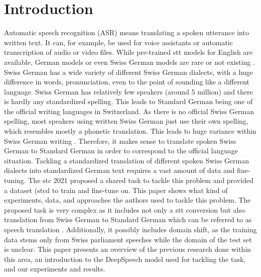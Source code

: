 \section{Introduction}
Automatic speech recognition (ASR) means translating a spoken utterance into written text. It can, for example, be used for voice assistants or automatic transcription of audio or video files. While
pre-trained \gls{stt} models for English are available, German models or even Swiss German models are rare or not existing \cite{Agarwal2019GermanES}. Swiss German has a wide variety of different
Swiss German dialects, with a huge difference in words, pronunciation, even to the point of sounding like a different language. Swiss German has relatively few speakers (around 5 million) and there
is hardly any standardized spelling. This leads to Standard German being one of the official writing languages in Switzerland. As there is no official Swiss German spelling, most speakers using written
Swiss German just use their own spelling, which resembles mostly a phonetic translation. This leads to huge variance within Swiss German writing \citep{pluss2020}. Therefore, it makes sense to
translate spoken Swiss German to Standard German in order to correspond to the official language situation. Tackling a standardized translation of different spoken Swiss German dialects into
standardized German text requires a vast amount of data and fine-tuning. The \gls{stc} 2021 proposed a shared task to tackle this problem and provided a dataset
(\gls{stcd} to train and fine-tune on. This paper shows what kind of experiments, data, and approaches the authors used to tackle this problem. The proposed task is very complex as it includes not only a \gls{stt} conversion but also translation from Swiss German to Standard German which can be referred to as speech translation \cite{pluss2020}. Additionally, it possibly includes domain shift, as the training data stems only from Swiss parliament speeches while the domain of the test set is unclear.
This paper presents an overview of the previous research done within this area, an introduction to the DeepSpeech model used for tackling the task, and our experiments and results.
